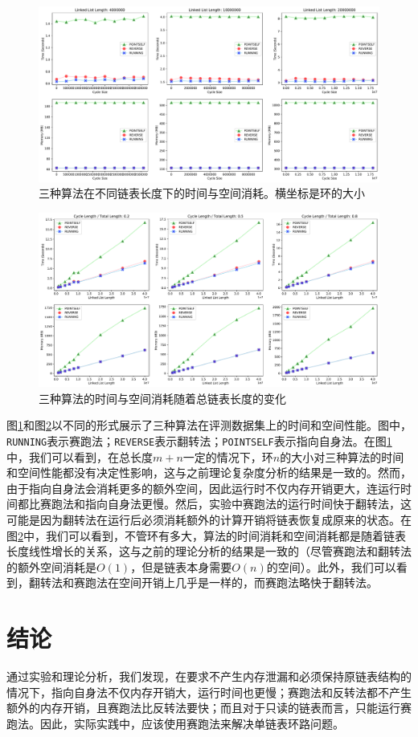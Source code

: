\documentclass[UTF8]{ctexart}
\begin{document}
\begin{figure}[h]
\includegraphics[width=\textwidth]{fig.pdf}
\caption{三种算法在不同链表长度下的时间与空间消耗。横坐标是环的大小}
\label{fig1}
\end{figure}

\begin{figure}
\includegraphics[width=\textwidth]{fig2.pdf}
\caption{三种算法的时间与空间消耗随着总链表长度的变化}
\label{fig2}
\end{figure}

图\ref{fig1}和图\ref{fig2}以不同的形式展示了三种算法在评测数据集上的时间和空间性能。图中，\texttt{RUNNING}表示赛跑法；\texttt{REVERSE}表示翻转法；\texttt{POINTSELF}表示指向自身法。在图\ref{fig1}中，我们可以看到，在总长度$m+n$一定的情况下，环$n$的大小对三种算法的时间和空间性能都没有决定性影响，这与之前理论复杂度分析的结果是一致的。然而，由于指向自身法会消耗更多的额外空间，因此运行时不仅内存开销更大，连运行时间都比赛跑法和指向自身法更慢。然后，实验中赛跑法的运行时间快于翻转法，这可能是因为翻转法在运行后必须消耗额外的计算开销将链表恢复成原来的状态。在图\ref{fig2}中，我们可以看到，不管环有多大，算法的时间消耗和空间消耗都是随着链表长度线性增长的关系，这与之前的理论分析的结果是一致的（尽管赛跑法和翻转法的额外空间消耗是$O(1)$，但是链表本身需要$O(n)$的空间）。此外，我们可以看到，翻转法和赛跑法在空间开销上几乎是一样的，而赛跑法略快于翻转法。

\section{结论}

通过实验和理论分析，我们发现，在要求不产生内存泄漏和必须保持原链表结构的情况下，指向自身法不仅内存开销大，运行时间也更慢；赛跑法和反转法都不产生额外的内存开销，且赛跑法比反转法要快；而且对于只读的链表而言，只能运行赛跑法。因此，实际实践中，应该使用赛跑法来解决单链表环路问题。




\end{document}
